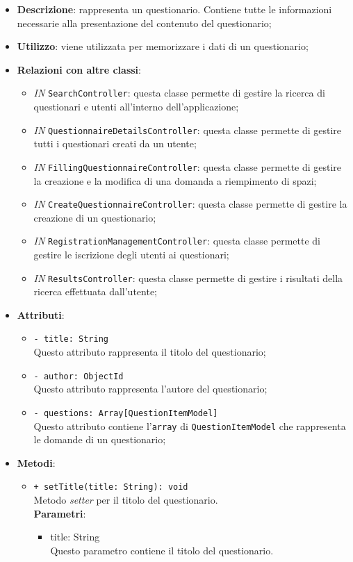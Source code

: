 		\begin{itemize}
			\item \textbf{Descrizione}: rappresenta un questionario. Contiene tutte le informazioni necessarie alla
			presentazione del contenuto del questionario;
			\item \textbf{Utilizzo}: viene utilizzata per memorizzare i dati di un questionario;
			\item \textbf{Relazioni con altre classi}: 
			\begin{itemize}
				\item \textit{IN} \texttt{SearchController}: questa classe permette di gestire la ricerca di questionari e utenti all'interno dell'applicazione;
				\item \textit{IN} \texttt{QuestionnaireDetailsController}: questa classe permette di gestire tutti i questionari creati da un utente; 
				\item \textit{IN} \texttt{FillingQuestionnaireController}: questa classe permette di gestire la creazione e la modifica di una domanda a riempimento di spazi;
				\item \textit{IN} \texttt{CreateQuestionnaireController}: questa classe permette di gestire la creazione di un questionario;
				\item \textit{IN} \texttt{RegistrationManagementController}: questa classe permette di gestire le iscrizione degli utenti ai questionari;
				\item \textit{IN} \texttt{ResultsController}: questa classe permette di gestire i risultati della ricerca effettuata dall'utente;
			\end{itemize}
			\item \textbf{Attributi}: 
			\begin{itemize}
				\item \texttt{- title: String}\\
				Questo attributo rappresenta il titolo del questionario;
				\item \texttt{- author: ObjectId}\\
				Questo attributo rappresenta l'autore del questionario;
				\item \texttt{- questions: Array[QuestionItemModel]}\\
				Questo attributo contiene l'\texttt{array} di \texttt{QuestionItemModel} che rappresenta le domande di un questionario;
			\end{itemize}
			\item \textbf{Metodi}: 
			\begin{itemize}
				\item \texttt{+ setTitle(title: String): void} \\
				Metodo \textit{setter} per il titolo del questionario.\\
				\textbf{Parametri}:
				\begin{itemize}
					\item {title: String}\\
					Questo parametro contiene il titolo del questionario. 
				\end{itemize}
				

\end{itemize}
\end{itemize}

